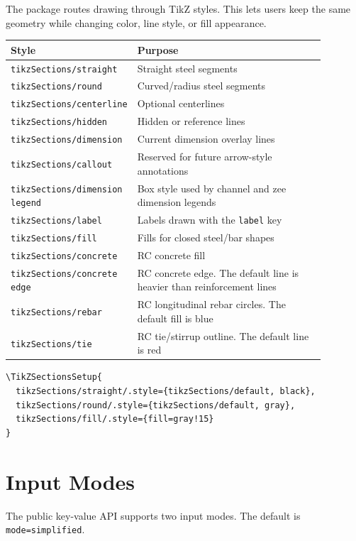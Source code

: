 \documentclass[10pt]{article}
\newcommand{\keyname}[1]{\texttt{#1}}
\begin{document}
The package routes drawing through TikZ styles. This lets users keep the same
geometry while changing color, line style, or fill appearance.

\begin{longtable}{p{0.28\linewidth}p{0.60\linewidth}}
\toprule
Style & Purpose \\
\midrule
\keyname{tikzSections/straight} & Straight steel segments \\
\keyname{tikzSections/round} & Curved/radius steel segments \\
\keyname{tikzSections/centerline} & Optional centerlines \\
\keyname{tikzSections/hidden} & Hidden or reference lines \\
\keyname{tikzSections/dimension} & Current dimension overlay lines \\
\keyname{tikzSections/callout} & Reserved for future arrow-style annotations \\
\keyname{tikzSections/dimension legend} & Box style used by channel and zee dimension legends \\
\keyname{tikzSections/label} & Labels drawn with the \keyname{label} key \\
\keyname{tikzSections/fill} & Fills for closed steel/bar shapes \\
\keyname{tikzSections/concrete} & RC concrete fill \\
\keyname{tikzSections/concrete edge} & RC concrete edge. The default line is heavier than reinforcement lines \\
\keyname{tikzSections/rebar} & RC longitudinal rebar circles. The default fill is blue \\
\keyname{tikzSections/tie} & RC tie/stirrup outline. The default line is red \\
\bottomrule
\end{longtable}

\begin{lstlisting}
\TikZSectionsSetup{
  tikzSections/straight/.style={tikzSections/default, black},
  tikzSections/round/.style={tikzSections/default, gray},
  tikzSections/fill/.style={fill=gray!15}
}
\end{lstlisting}

\section{Input Modes}

The public key-value API supports two input modes. The default is
\keyname{mode=simplified}.
\end{document}
